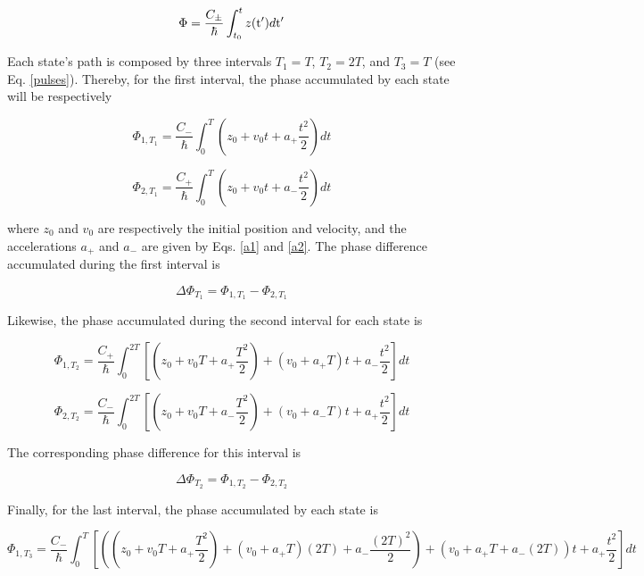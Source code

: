 \documentclass{article}
\begin{document}
\begin{equation}\label{semi_classical_phase}
\Phi = \frac{C_{\pm}}{\hbar} \int_{t_{0}}^{t} z(\ce{^{}_{}t{'}_{}})d\ce{^{}_{}t{'}_{}}
\end{equation}

Each state's path is composed by three intervals $T_{1}=T$, $T_{2}=2T$, and $T_{3}=T$ (see Eq. \ref{pulses}). Thereby, for the first interval, the phase accumulated by each state will be respectively

\begin{equation}\label{phi1t1}
\Phi_{1, T_{1}} = \frac{C_{-}}{\hbar} \int_{0}^{T} (z_{0}+v_{0}t+a_{+} \frac{t^{2}}{2})dt
\end{equation}

\begin{equation}
\Phi_{2, T_{1}} = \frac{C_{+}}{\hbar} \int_{0}^{T} (z_{0}+v_{0}t+a_{-} \frac{t^{2}}{2})dt
\end{equation}

where $z_{0}$ and $v_{0}$ are respectively the initial position and velocity,
and the accelerations $a_{+}$ and $a_{-}$ are given by Eqs. \ref{a1} and \ref{a2}. The phase difference accumulated during the first interval is

\begin{equation}
\Delta \Phi_{T_{1}} = \Phi_{1, T_{1}} - \Phi_{2, T_{1}}
\end{equation}

Likewise, the phase accumulated during the second interval for each state is

\begin{equation}
\Phi_{1, T_{2}} = \frac{C_{+}}{\hbar} \int_{0}^{2T} [(z_{0}+v_{0}T+a_{+} \frac{T^{2}}{2}) + (v_{0}+a_{+}T)t + a_{-} \frac{t^{2}}{2}]dt
\end{equation}

\begin{equation}
\Phi_{2, T_{2}} = \frac{C_{-}}{\hbar} \int_{0}^{2T} [(z_{0}+v_{0}T+a_{-} \frac{T^{2}}{2}) + (v_{0}+a_{-}T)t + a_{+} \frac{t^{2}}{2}]dt
\end{equation}

The corresponding phase difference for this interval is

\begin{equation}
\Delta \Phi_{T_{2}} = \Phi_{1, T_{2}} - \Phi_{2, T_{2}}
\end{equation}

Finally, for the last interval, the phase accumulated by each state is

\begin{equation}
\Phi_{1, T_{3}} = \frac{C_{-}}{\hbar} \int_{0}^{T} [((z_{0}+v_{0}T+a_{+} \frac{T^{2}}{2}) + (v_{0}+a_{+}T)(2T) + a_{-} \frac{(2T)^{2}}{2}) + (v_{0}+a_{+}T + a_{-}(2T))t + a_{+} \frac{t^{2}}{2}]dt
\end{equation}
\end{document}
